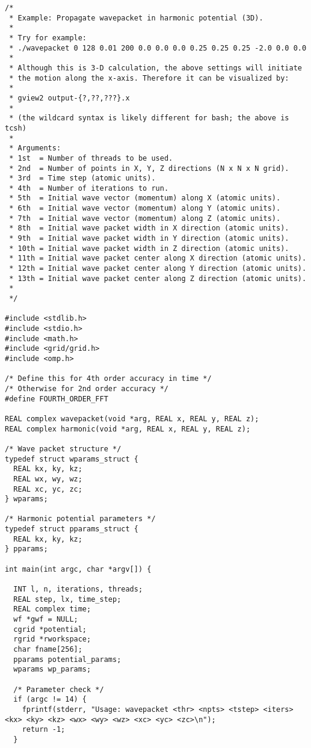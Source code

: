 \documentclass[12pt,letterpaper]{report}
\begin{document}
\begin{verbatim}
/*
 * Example: Propagate wavepacket in harmonic potential (3D).
 *
 * Try for example:
 * ./wavepacket 0 128 0.01 200 0.0 0.0 0.0 0.25 0.25 0.25 -2.0 0.0 0.0
 *
 * Although this is 3-D calculation, the above settings will initiate
 * the motion along the x-axis. Therefore it can be visualized by:
 *
 * gview2 output-{?,??,???}.x
 * 
 * (the wildcard syntax is likely different for bash; the above is tcsh)
 *
 * Arguments:
 * 1st  = Number of threads to be used.
 * 2nd  = Number of points in X, Y, Z directions (N x N x N grid).
 * 3rd  = Time step (atomic units).
 * 4th  = Number of iterations to run.
 * 5th  = Initial wave vector (momentum) along X (atomic units).
 * 6th  = Initial wave vector (momentum) along Y (atomic units).
 * 7th  = Initial wave vector (momentum) along Z (atomic units).
 * 8th  = Initial wave packet width in X direction (atomic units).
 * 9th  = Initial wave packet width in Y direction (atomic units).
 * 10th = Initial wave packet width in Z direction (atomic units).
 * 11th = Initial wave packet center along X direction (atomic units).
 * 12th = Initial wave packet center along Y direction (atomic units).
 * 13th = Initial wave packet center along Z direction (atomic units).
 *
 */

#include <stdlib.h>
#include <stdio.h>
#include <math.h>
#include <grid/grid.h>
#include <omp.h>

/* Define this for 4th order accuracy in time */
/* Otherwise for 2nd order accuracy */
#define FOURTH_ORDER_FFT

REAL complex wavepacket(void *arg, REAL x, REAL y, REAL z);
REAL complex harmonic(void *arg, REAL x, REAL y, REAL z);

/* Wave packet structure */
typedef struct wparams_struct {
  REAL kx, ky, kz;
  REAL wx, wy, wz;
  REAL xc, yc, zc;
} wparams;

/* Harmonic potential parameters */
typedef struct pparams_struct {
  REAL kx, ky, kz;
} pparams;

int main(int argc, char *argv[]) {

  INT l, n, iterations, threads;
  REAL step, lx, time_step;
  REAL complex time;
  wf *gwf = NULL;
  cgrid *potential;
  rgrid *rworkspace;
  char fname[256];
  pparams potential_params;
  wparams wp_params;
  
  /* Parameter check */
  if (argc != 14) {
    fprintf(stderr, "Usage: wavepacket <thr> <npts> <tstep> <iters> <kx> <ky> <kz> <wx> <wy> <wz> <xc> <yc> <zc>\n");
    return -1;
  }
  

\end{verbatim}
\end{document}
